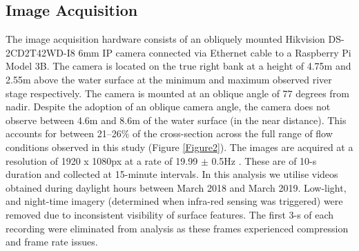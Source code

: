 \documentclass[hess, manuscript]{copernicus} %
\begin{document}
\subsection{Image Acquisition}
The image acquisition hardware consists of an obliquely mounted Hikvision DS-2CD2T42WD-I8 6mm IP camera connected via Ethernet cable to a Raspberry Pi Model 3B. The camera is located on the true right bank at a height of 4.75m and 2.55m above the water surface at the minimum and maximum observed river stage respectively. The camera is mounted at an oblique angle of 77 degrees from nadir. Despite the adoption of an oblique camera angle, the camera does not observe between 4.6m and 8.6m of the water surface (in the near distance). This accounts for between 21--26\% of the cross-section across the full range of flow conditions observed in this study (Figure \ref{Figure2}). The images are acquired at a resolution of 1920 x 1080px at a rate of 19.99 $\pm$ 0.5Hz \citep[95\% confidence interval;][]{vid_analysis}. These are of 10-s duration and collected at 15-minute intervals. In this analysis we utilise videos obtained during daylight hours between March 2018 and March 2019. Low-light, and night-time imagery (determined when infra-red sensing was triggered) were removed due to inconsistent visibility of surface features. The first 3-s of each recording were eliminated from analysis as these frames experienced compression and frame rate issues.
\end{document}
